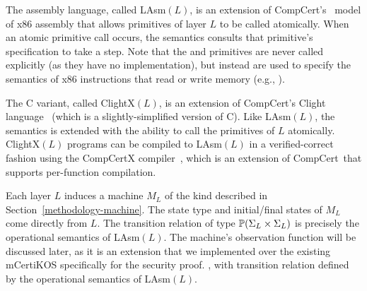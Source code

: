 The assembly language, called LAsm$(L)$, is an extension of 
CompCert's~\cite{compcert} model of x86 assembly that allows primitives
of layer $L$ to be called atomically. When an atomic primitive call
occurs, the semantics consults that primitive's specification
to take a step. Note that the  and  primitives are never
called explicitly (as they have no implementation), but instead
are used to specify the semantics of x86 instructions that read or
write memory (e.g., ).

The C variant, called ClightX$(L)$, is an extension of
CompCert's Clight language~\cite{blazy-leroy-clight} (which is a 
slightly-simplified version of C). Like LAsm$(L)$, the semantics
is extended with the ability to call the primitives of $L$
atomically. ClightX$(L)$ programs can be compiled to LAsm$(L)$
in a verified-correct fashion using the CompCertX 
compiler~\cite{certikos-popl}, which is an extension of 
CompCert\ifextended~that supports per-function compilation\else\fi.

Each layer $L$ induces a machine $M_L$ of the kind described in
Section~\ref{methodology-machine}\ifextended. The state type and initial/final states
of $M_L$ come directly from $L$. The transition relation of
type $\mathbb{P}(\Sigma_L \times \Sigma_L)$ is precisely the operational 
semantics of LAsm$(L)$. The machine's observation function will be 
discussed later, as it is an extension that we implemented over
the existing mCertiKOS specifically for the security proof.
\else, with transition relation defined
by the operational semantics of LAsm$(L)$.
\fi

